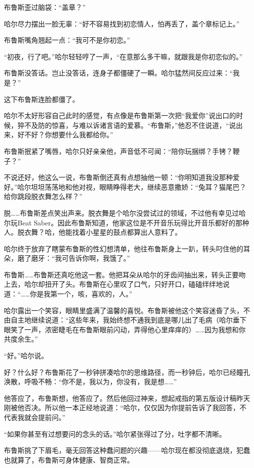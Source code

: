 \documentclass[../main]{subfiles}
\begin{document}
布鲁斯歪过脑袋：“盖章？”

哈尔尽力摆出一脸无辜：“好不容易找到初恋情人，怕再丢了，盖个章标记上。”

布鲁斯嘴角翘起一点：“我可不是你初恋。”

“初夜，行了吧。”哈尔轻轻哼了一声，“在意那么多干嘛，就跟我是你初恋似的。”

布鲁斯没答话。岂止没答话，连身子都僵硬了一瞬。哈尔猛然间反应过来：“我是？”

这下布鲁斯连脸都僵了。

哈尔不太好形容自己此时的感觉，有点像是布鲁斯第一次把“我爱你”说出口的时候，猝不及防的惊喜，与难以诉诸言语的爱慕。“布鲁斯，”他忍不住说道，“说出来，好不好？你想要什么我都给你。”

布鲁斯抿紧了嘴唇，哈尔只好亲亲他，声音低不可闻：“陪你玩捆绑？手铐？鞭子？”

不说还好，他这么一说，布鲁斯倒还真有点想抽他一顿：“你明知道我没那种爱好。”哈尔坦坦荡荡地和他对视，眼睛睁得老大，继续恶意撒娇：“兔耳？猫尾巴？给你跳段脱衣舞怎么样？”

脱……布鲁斯差点笑出声来。脱衣舞是个哈尔没尝试过的领域，不过他有幸见过哈尔玩Beat
Saber。因此布鲁斯知道，他家这位是不开音乐玩得比开音乐都好的那种人。脱衣舞？哈，他能找着小星星的鼓点都算出人意料了。

哈尔终于放弃了瞎蒙布鲁斯的性幻想清单，他往布鲁斯身上一趴，转头叼住他的耳朵，磨了磨牙：“我可告诉你啊，我饿了。”

布鲁斯……布鲁斯还真吃他这一套。他把耳朵从哈尔的牙齿间抽出来，转头正要吻上去，哈尔却扭开了头。布鲁斯在心里叹了口气，只好开口，磕磕绊绊地说道：“……你是我第一个，咳，喜欢的，人。”

哈尔露出一个笑容，眼睛里盛满了温馨的喜悦。布鲁斯被他这个笑容迷昏了头，不由自主地继续说道：“这些年来，我始终想不通我到底是哪儿出了毛病（哈尔垂下眼笑了一声，浓密睫毛在布鲁斯眼前闪动，弄得他心里痒痒的）……因为我想和你共度余生。”

“好。”哈尔说。

好？什么好？布鲁斯花了一秒钟拼凑哈尔的思维路径，而一秒钟后，哈尔已经瞳孔涣散，呼吸不畅：“你不是，我以为，你没有，我是想\ldots\ldots”

他答应了，布鲁斯想，他答应了。然后他回过神来，想起戒指的第五版设计稿昨天刚被他否决。所以他一本正经地说道：“哈尔，仅仅因为你提前告诉了我回答，不代表我就会提前问。”

“如果你甚至有过想要问的念头的话。”哈尔紧张得过了分，吐字都不清晰。

布鲁斯挑了下眉毛，毫无回答这种蠢问题的兴趣——哈尔现在都没彻底退烧，犯蠢也就算了，布鲁斯可身体健康、智商正常。
\end{document}

